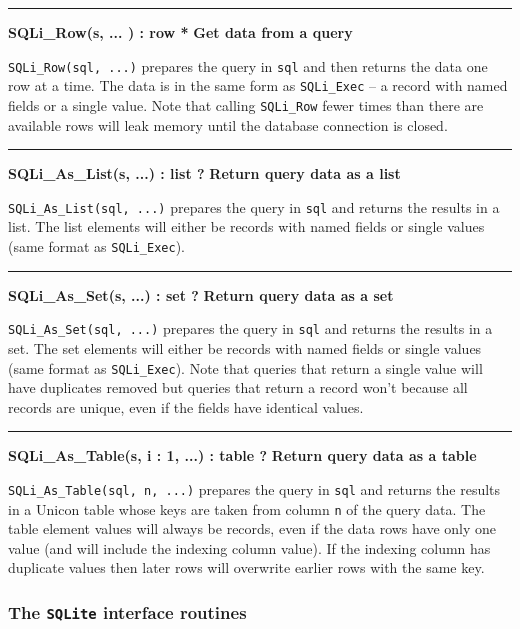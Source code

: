 \bigskip\hrule\vspace{0.1cm}
\noindent
{\bf SQLi\_Row(s, ... ) : row * } \hfill {\bf Get data from a query}

\noindent
\texttt{SQLi\_Row(sql, ...)} prepares the query in \texttt{sql} and then returns
the data one row at a time. The data is in the same form as \texttt{SQLi\_Exec} -- a
record with named fields or a single value.  Note that calling \texttt{SQLi\_Row}
fewer times than there are available rows will leak memory until the database
connection is closed.

\bigskip\hrule\vspace{0.1cm}
\noindent
{\bf SQLi\_As\_List(s, ...) : list ? } \hfill {\bf Return query data as a list}

\noindent
\texttt{SQLi\_As\_List(sql, ...)}  prepares the query in \texttt{sql} and returns
the results in a list. The list elements will either be records with named
fields or single values (same format as \texttt{SQLi\_Exec}).

\bigskip\hrule\vspace{0.1cm}
\noindent
{\bf SQLi\_As\_Set(s, ...) : set ? } \hfill {\bf Return query data as a set}

\noindent
\texttt{SQLi\_As\_Set(sql, ...)}  prepares the query in \texttt{sql} and returns
the results in a set. The set elements will either be records with named
fields or single values (same format as \texttt{SQLi\_Exec}).
Note that queries that return a single value will have duplicates removed but
queries that return a record won't because all records are unique, even if the
fields have identical values.

\bigskip\hrule\vspace{0.1cm}
\noindent
{\bf SQLi\_As\_Table(s, i : 1, ...) : table ? } \hfill {\bf Return query data as a table}

\noindent
\texttt{SQLi\_As\_Table(sql, n, ...)}  prepares the query in \texttt{sql} and
returns the results in a Unicon table whose keys are taken from column
\texttt{n} of the query data. The table element values will always be records,
even if the data rows have only one value (and will include the indexing column
value). If the indexing column has duplicate values then later rows will
overwrite earlier rows with the same key.
\subsubsection{The \texttt{SQLite} interface routines}

